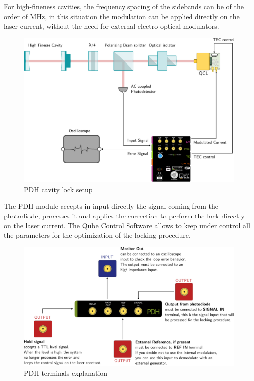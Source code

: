 For high-fineness cavities, the frequency spacing of the sidebands can be of the order of MHz, in this situation the modulation can be applied directly on the laser current, without the need for external electro-optical modulators.


\begin{figure}[H]
\centering
\includegraphics[width=12cm]{images/PDH_EXPERIMENT_DEMO.pdf}
\caption{PDH cavity lock setup}
\end{figure}

The PDH module accepts in input directly the signal coming from the photodiode, processes it and applies the correction to perform the lock directly on the laser current. The  Qube Control Software allows to keep under control all the parameters for the optimization of the locking procedure.

\begin{figure}[H]
\centering
\includegraphics[width=12cm]{images/PDH_INPUT_EXPLANATION.pdf}
\caption{PDH terminals explanation}
\end{figure}

